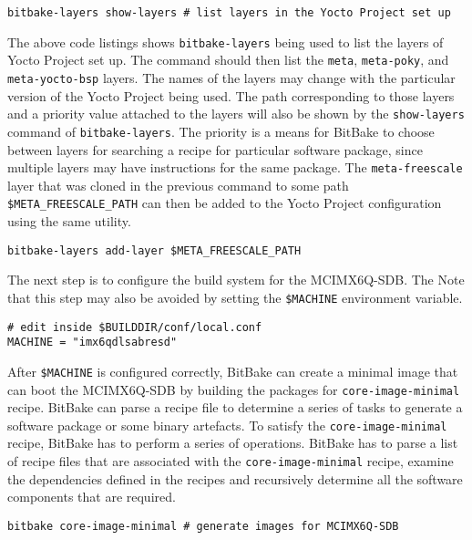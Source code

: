 \begin{verbatim}
bitbake-layers show-layers # list layers in the Yocto Project set up
\end{verbatim}

The above code listings shows \texttt{bitbake-layers} being used to list the layers of Yocto Project set up. The command should then list the \texttt{meta}, \texttt{meta-poky}, and \texttt{meta-yocto-bsp} layers. The names of the layers may change with the particular version of the Yocto Project being used. The path corresponding to those layers and a priority value attached to the layers will also be shown by the \texttt{show-layers} command of \texttt{bitbake-layers}. The priority is a means for BitBake to choose between layers for searching a recipe for particular software package, since multiple layers may have instructions for the same package. The \texttt{meta-freescale} layer that was cloned in the previous command to some path \texttt{\$META\_FREESCALE\_PATH} can then be added to the Yocto Project configuration using the same utility.

\begin{verbatim}
bitbake-layers add-layer $META_FREESCALE_PATH
\end{verbatim}

The next step is to configure the build system for the MCIMX6Q-SDB. The Note that this step may also be avoided by setting the \texttt{\$MACHINE} environment variable.

\begin{verbatim}
# edit inside $BUILDDIR/conf/local.conf
MACHINE = "imx6qdlsabresd"
\end{verbatim}

After \texttt{\$MACHINE} is configured correctly, BitBake can create a minimal image that can boot the MCIMX6Q-SDB by building the packages for \texttt{core-image-minimal} recipe. BitBake can parse a recipe file to determine a series of tasks to generate a software package or some binary artefacts. To satisfy the \texttt{core-image-minimal} recipe, BitBake has to perform a series of operations. BitBake has to parse a list of recipe files that are associated with the \texttt{core-image-minimal} recipe, examine the dependencies defined in the recipes and recursively determine all the software components that are required.

\begin{verbatim}
bitbake core-image-minimal # generate images for MCIMX6Q-SDB
\end{verbatim}

